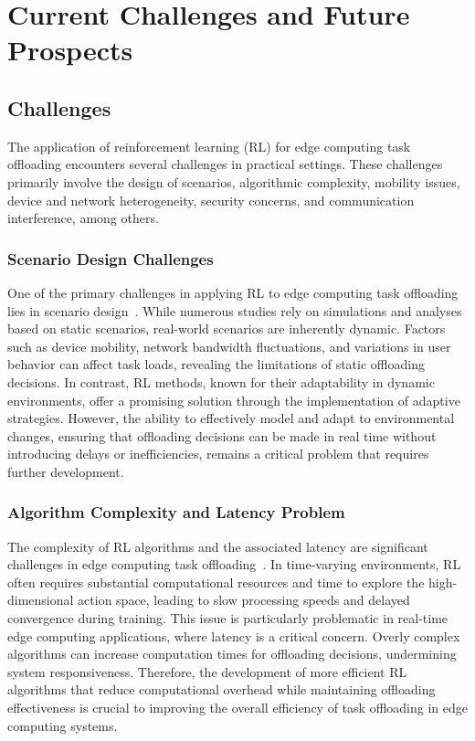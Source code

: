 \documentclass[journal]{IEEEtran}
\begin{document}
\section{Current Challenges and Future Prospects}

\subsection{Challenges}

The application of reinforcement learning (RL) for edge computing task offloading encounters several challenges in practical settings. These challenges primarily involve the design of scenarios, algorithmic complexity, mobility issues, device and network heterogeneity, security concerns, and communication interference, among others.

\subsubsection{Scenario Design Challenges}
One of the primary challenges in applying RL to edge computing task offloading lies in scenario design~\cite{zhou06}. While numerous studies rely on simulations and analyses based on static scenarios, real-world scenarios are inherently dynamic. Factors such as device mobility, network bandwidth fluctuations, and variations in user behavior can affect task loads, revealing the limitations of static offloading decisions. In contrast, RL methods, known for their adaptability in dynamic environments, offer a promising solution through the implementation of adaptive strategies. However, the ability to effectively model and adapt to environmental changes, ensuring that offloading decisions can be made in real time without introducing delays or inefficiencies, remains a critical problem that requires further development.

\subsubsection{Algorithm Complexity and Latency Problem}
The complexity of RL algorithms and the associated latency are significant challenges in edge computing task offloading~\cite{zhou07}. In time-varying environments, RL often requires substantial computational resources and time to explore the high-dimensional action space, leading to slow processing speeds and delayed convergence during training. This issue is particularly problematic in real-time edge computing applications, where latency is a critical concern. Overly complex algorithms can increase computation times for offloading decisions, undermining system responsiveness. Therefore, the development of more efficient RL algorithms that reduce computational overhead while maintaining offloading effectiveness is crucial to improving the overall efficiency of task offloading in edge computing systems.
\end{document}
